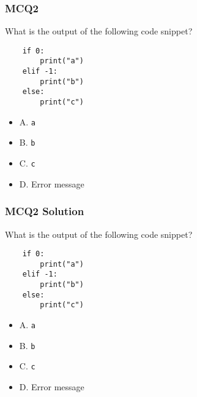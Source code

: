\documentclass{beamer}
\begin{document}
\begin{frame}[fragile]
    \frametitle{MCQ2}
    What is the output of the following code snippet?
    \begin{verbatim}
    if 0:
        print("a")
    elif -1:
        print("b")
    else:
        print("c")
    \end{verbatim}

    \begin{itemize}
        \item A. \texttt{a}
        \item B. \texttt{b}
        \item C. \texttt{c}
        \item D. Error message
    \end{itemize}
\end{frame}
\begin{frame}[fragile]
    \frametitle{MCQ2 Solution}
    What is the output of the following code snippet?
    \begin{verbatim}
    if 0:
        print("a")
    elif -1:
        print("b")
    else:
        print("c")
    \end{verbatim}

    \begin{itemize}
        \item A. \texttt{a}
        \item \alert{B. \texttt{b}}
        \item C. \texttt{c}
        \item D. Error message
    \end{itemize}
\end{frame}
\end{document}
